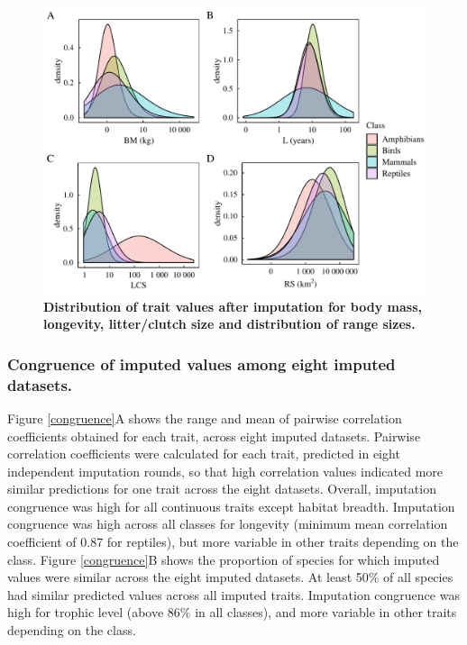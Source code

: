 \begin{figure}[h!]
\centering
\includegraphics[scale=0.7]{figures/chapter2/Imputation_errors/Distributions}
\caption[Distribution of trait values after imputation for body mass, longevity, litter/clutch size and distribution of range sizes]{\textbf{Distribution of trait values after imputation for body mass, longevity, litter/clutch size and distribution of range sizes.}}
\label{traitdist}
\end{figure}



\subsubsection{Congruence of imputed values among eight imputed datasets.}

Figure \ref{congruence}A shows the range and mean of pairwise correlation coefficients obtained for each trait, across eight imputed datasets. Pairwise correlation coefficients were calculated for each trait, predicted in eight independent imputation rounds, so that high correlation  values indicated more similar predictions for one trait across the eight datasets. Overall, imputation congruence was high for all continuous traits except habitat breadth. Imputation congruence was high across all classes for longevity (minimum mean correlation coefficient of 0.87 for reptiles), but more variable in other traits depending on the class.
Figure \ref{congruence}B shows the proportion of species for which imputed values were similar across the eight imputed datasets. At least 50\% of all species had similar predicted values across all imputed traits. Imputation congruence was high for trophic level (above 86\% in all classes), and more variable in other traits depending on the class. 

